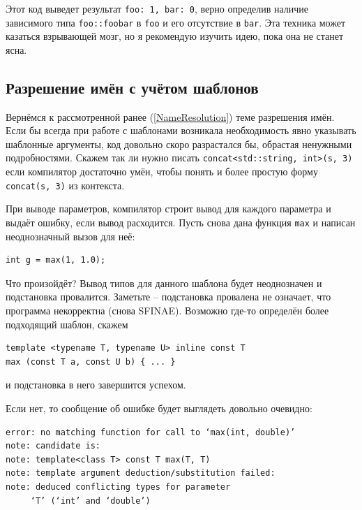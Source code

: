 \documentclass[a4paper,12pt,oneside]{article}
\begin{document}
Этот код выведет результат \lstinline!foo: 1, bar: 0!, верно определив наличие зависимого типа \lstinline!foo::foobar! в \lstinline!foo! и его отсутствие в \lstinline!bar!. Эта техника может казаться взрывающей мозг, но я рекомендую изучить идею, пока она не станет ясна.

\subsection{Разрешение имён с учётом шаблонов}

Вернёмся к рассмотренной ранее (\ref{NameResolution}) теме разрешения имён. Если бы всегда при работе с шаблонами возникала необходимость явно указывать шаблонные аргументы, код довольно скоро разрастался бы, обрастая ненужными подробностями. Скажем так ли нужно писать \lstinline!concat<std::string, int>(s, 3)! если компилятор достаточно умён, чтобы понять и более простую форму \lstinline!concat(s, 3)! из контекста.

При выводе параметров, компилятор строит вывод для каждого параметра и выдаёт ошибку, если вывод расходится. Пусть снова дана функция \lstinline!max! и написан неоднозначный вызов для неё:



\begin{lstlisting}
int g = max(1, 1.0);
\end{lstlisting}

Что произойдёт? Вывод типов для данного шаблона будет неоднозначен и подстановка провалится. Заметьте -- подстановка провалена не означает, что программа некорректна (снова SFINAE). Возможно где-то определён более подходящий шаблон, скажем 

\begin{lstlisting}
template <typename T, typename U> inline const T 
max (const T a, const U b) { ... }
\end{lstlisting}

и подстановка в него завершится успехом.

Если нет, то сообщение об ошибке будет выглядеть довольно очевидно:

\begin{verbatim}
error: no matching function for call to ‘max(int, double)’
note: candidate is:
note: template<class T> const T max(T, T)
note: template argument deduction/substitution failed:
note: deduced conflicting types for parameter 
     ‘T’ (‘int’ and ‘double’)
\end{verbatim}
\end{document}
